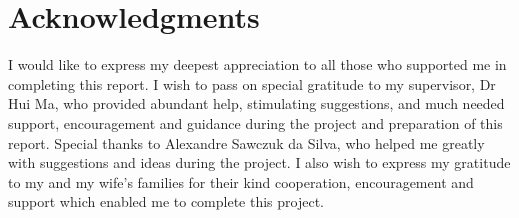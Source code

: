 \chapter*{Acknowledgments}\label{C:ack} 

I would like to express my deepest appreciation to all those who supported me in completing this report. I wish to pass on special gratitude to my supervisor, Dr Hui Ma, who provided abundant help, stimulating suggestions, and much needed support, encouragement and guidance during the project and preparation of this report. Special thanks to Alexandre Sawczuk da Silva, who helped me greatly with suggestions and ideas during the project. I also wish to express my gratitude to my and my wife's families for their kind cooperation, encouragement and support which enabled me to complete this project. 
